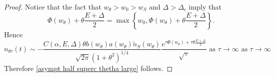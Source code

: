 \documentclass[10pt,a4paper]{amsart}
\begin{document}
\begin{proof}
Notice that the fact that $ w_\theta > w_0 > w_S  $ and $\Delta > \Delta_c$ imply that
\[ 
\Phi(w_\theta) + \theta \frac{E+ \Delta }{2} =\max\left\{ w_0 , \Phi(w_\theta) + \theta \frac{E+ \Delta }{2} \right\}. 
\]
Hence
\[ 
   n_{\theta \tau } (t)\sim 
        - \frac{ C(\alpha, E, \Delta)  \theta  b(w_\theta)   a(w_\theta ) \tilde{n}_S(w_\theta )}{\sqrt{2 \pi } (1+\theta^2)^{1/4}} \frac{ e^{ \tau \Phi(w_\theta ) + \tau\theta  \frac{E+ \Delta}{2}}}{\sqrt{\tau}} \text{ as } \tau \to \infty
        \text{ as } \tau \to \infty
\]
Therefore 
\eqref{asympt half superc thetha large} follows. 

\end{proof}
\end{document}
